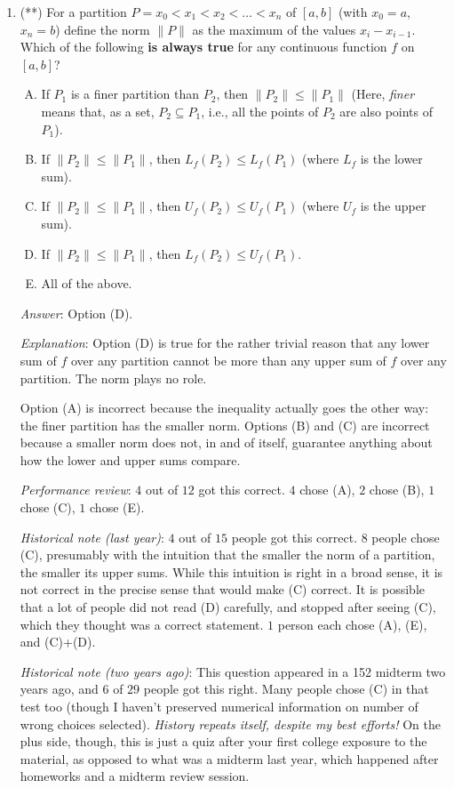 \documentclass[10pt]{amsart}
\begin{document}
\begin{enumerate}
\item (**) For a partition $P = x_0 < x_1 < x_2 < \dots < x_n$ of
  $[a,b]$ (with $x_0 = a$, $x_n = b$) define the norm $\| P \|$ as the
  maximum of the values $x_i - x_{i-1}$. Which of the following {\bf
  is always true} for any continuous function $f$ on $[a,b]$?

  \begin{enumerate}[(A)]
  \item If $P_1$ is a finer partition than $P_2$, then $\| P_2 \| \le
    \| P_1 \|$ (Here, {\em finer} means that, as a set, $P_2 \subseteq
    P_1$, i.e., all the points of $P_2$ are also points of $P_1$).
  \item If $\| P_2 \| \le \| P_1 \|$, then $L_f(P_2) \le L_f(P_1)$
    (where $L_f$ is the lower sum).
  \item If $\| P_2 \| \le \| P_1 \|$, then $U_f(P_2) \le U_f(P_1)$
    (where $U_f$ is the upper sum).
  \item If $\| P_2 \| \le \| P_1 \|$, then $L_f(P_2) \le U_f(P_1)$.
  \item All of the above.
  \end{enumerate}

  {\em Answer}: Option (D).

  {\em Explanation}: Option (D) is true for the rather trivial reason
  that any lower sum of $f$ over any partition cannot be more than any
  upper sum of $f$ over any partition. The norm plays no role.

  Option (A) is incorrect because the inequality actually goes the
  other way: the finer partition has the smaller norm. Options (B) and
  (C) are incorrect because a smaller norm does not, in and of itself,
  guarantee anything about how the lower and upper sums compare.

  {\em Performance review}: $4$ out of $12$ got this correct. $4$
  chose (A), $2$ chose (B), $1$ chose (C), $1$ chose (E).

  {\em Historical note (last year)}: $4$ out of $15$ people got this
  correct. $8$ people chose (C), presumably with the intuition that
  the smaller the norm of a partition, the smaller its upper
  sums. While this intuition is right in a broad sense, it is not
  correct in the precise sense that would make (C) correct. It is
  possible that a lot of people did not read (D) carefully, and
  stopped after seeing (C), which they thought was a correct
  statement. $1$ person each chose (A), (E), and (C)+(D).

  {\em Historical note (two years ago)}: This question appeared in a
  152 midterm two years ago, and $6$ of $29$ people got this
  right. Many people chose (C) in that test too (though I haven't
  preserved numerical information on number of wrong choices
  selected). {\em History repeats itself, despite my best efforts!} On
  the plus side, though, this is just a quiz after your first college
  exposure to the material, as opposed to what was a midterm last
  year, which happened after homeworks and a midterm review session.


\end{enumerate}
\end{document}
